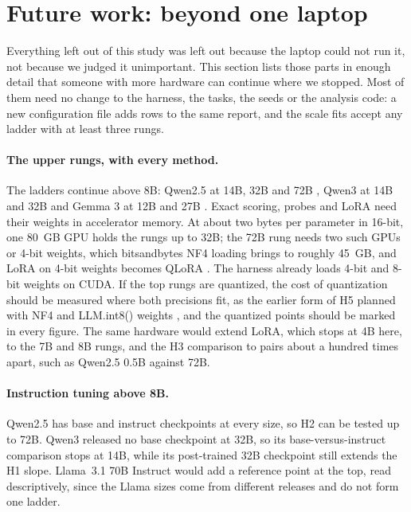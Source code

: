 \section{Future work: beyond one laptop}
\label{sec:future}

Everything left out of this study was left out because the laptop could not run it, not because we judged it unimportant. This section lists those parts in enough detail that someone with more hardware can continue where we stopped. Most of them need no change to the harness, the tasks, the seeds or the analysis code: a new configuration file adds rows to the same report, and the scale fits accept any ladder with at least three rungs.

\paragraph{The upper rungs, with every method.}
The ladders continue above 8B: Qwen2.5 at 14B, 32B and 72B \citep{qwen2024qwen25}, Qwen3 at 14B and 32B \citep{yang2025qwen3} and Gemma 3 at 12B and 27B \citep{gemma2025gemma3}. Exact scoring, probes and LoRA need their weights in accelerator memory. At about two bytes per parameter in 16-bit, one 80~GB GPU holds the rungs up to 32B; the 72B rung needs two such GPUs or 4-bit weights, which bitsandbytes NF4 loading brings to roughly 45~GB, and LoRA on 4-bit weights becomes QLoRA \citep{dettmers2023qlora}. The harness already loads 4-bit and 8-bit weights on CUDA. If the top rungs are quantized, the cost of quantization should be measured where both precisions fit, as the earlier form of H5 planned with NF4 and LLM.int8() weights \citep{dettmers2022llmint8}, and the quantized points should be marked in every figure. The same hardware would extend LoRA, which stops at 4B here, to the 7B and 8B rungs, and the H3 comparison to pairs about a hundred times apart, such as Qwen2.5 0.5B against 72B.

\paragraph{Instruction tuning above 8B.}
Qwen2.5 has base and instruct checkpoints at every size, so H2 can be tested up to 72B. Qwen3 released no base checkpoint at 32B, so its base-versus-instruct comparison stops at 14B, while its post-trained 32B checkpoint still extends the H1 slope. Llama~3.1 70B Instruct \citep{grattafiori2024llama3} would add a reference point at the top, read descriptively, since the Llama sizes come from different releases and do not form one ladder.

